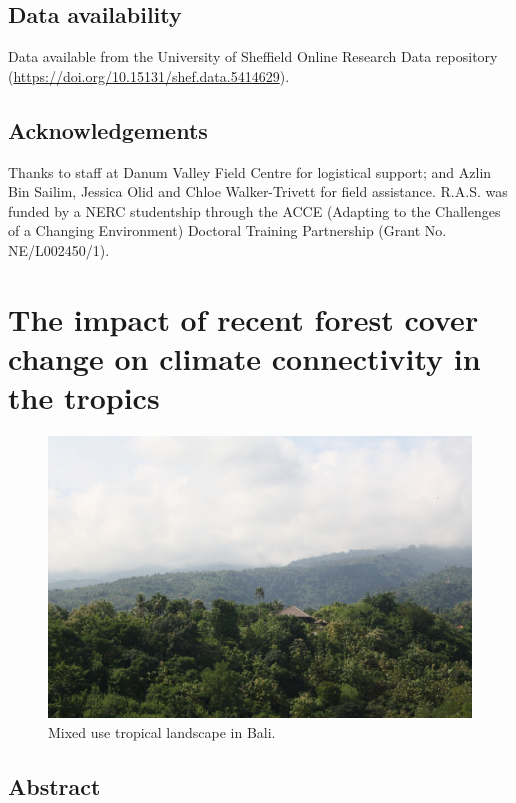 \documentclass[12pt,a4paper,]{report}
\theoremstyle{definition}
\theoremstyle{definition}
\theoremstyle{definition}
\theoremstyle{remark}
\begin{document}
\section{Data availability}\label{data-availability}

Data available from the University of Sheffield Online Research Data
repository (\url{https://doi.org/10.15131/shef.data.5414629}).

\section{Acknowledgements}\label{acknowledgements-2}

Thanks to staff at Danum Valley Field Centre for logistical support; and
Azlin Bin Sailim, Jessica Olid and Chloe Walker-Trivett for field
assistance. R.A.S. was funded by a NERC studentship through the ACCE
(Adapting to the Challenges of a Changing Environment) Doctoral Training
Partnership (Grant No. NE/L002450/1).

\chapter{The impact of recent forest cover change on climate
connectivity in the
tropics}\label{the-impact-of-recent-forest-cover-change-on-climate-connectivity-in-the-tropics}

\begin{figure}[!htb]
\centering
\includegraphics[width=15cm]{pics/landscape1.jpg}
\caption*{Mixed use tropical landscape in Bali.}
\end{figure}

\pagebreak

\section{Abstract}\label{abstract-4}
\end{document}
